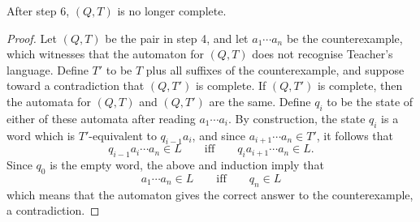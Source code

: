 \begin{lemma}
After step 6, $(Q,T)$ is no longer complete.
\end{lemma}
\begin{proof}
Let $(Q,T)$ be the pair in step 4, and let $a_1 \cdots a_n$ be the counterexample, which witnesses that the automaton for $(Q,T)$ does not recognise Teacher's language. Define $T'$ to be $T$ plus all suffixes of the counterexample, and suppose toward a contradiction that $(Q,T')$ is complete.  If $(Q,T')$ is complete, then  the automata for $(Q,T)$ and $(Q,T')$ are the same. Define $q_i$ to be the state of either of these automata after reading $a_1 \cdots a_i$.  By construction, the state $q_{i}$ is a word which is $T'$-equivalent to $q_{i-1} a_i$, and since $a_{i+1} \cdots a_n \in T'$, it follows that $$ q_{i-1} a_{i} \cdots a_n \in L \qquad \mbox{iff} \qquad q_{i} a_{i+1} \cdots a_n \in L.$$
Since $q_0$ is the empty word, the above and induction imply that
$$ a_1 \cdots a_n \in L \qquad \mbox{iff} \qquad q_n \in L$$
which means that the automaton gives the correct answer to the counterexample, a  contradiction. 	
\end{proof}






